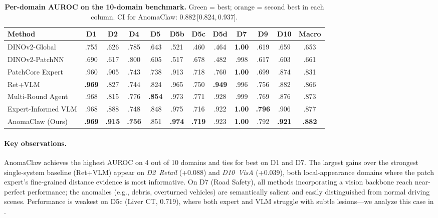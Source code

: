 \begin{table}[t]
\centering
\caption{%
    \textbf{Per-domain AUROC on the 10-domain benchmark.}
    \colorbox{bestcolor}{Green} = best; \colorbox{secondcolor}{orange} = second best in each column.
    CI for AnomaClaw: 0.882\,[0.824,\,0.937].
}
\label{tab:main_results}
\small
\setlength{\tabcolsep}{3.8pt}
\begin{tabular}{@{}lcccccccccc|c@{}}
\toprule
Method & D1 & D2 & D4 & D5 & D5b & D5c & D5d & D7 & D9 & D10 & Macro \\
\midrule
DINOv2-Global
    & .755 & .626 & .785 & .643 & .521 & .460 & .464
    & \cellcolor{bestcolor}\textbf{1.00} & .619 & .659 & .653 \\
DINOv2-PatchNN
    & .690 & .617 & \cellcolor{secondcolor}.800 & .605 & .517 & .678 & .482
    & \cellcolor{secondcolor}.998 & .617 & .603 & .661 \\
PatchCore Expert
    & .960 & .905 & .743 & .738 & .913 & \cellcolor{secondcolor}.718 & .760
    & \cellcolor{bestcolor}\textbf{1.00} & .699 & .874 & .831 \\
Ret+VLM
    & \cellcolor{bestcolor}\textbf{.969} & .827 & .744 & .824 & .965 & .750 & \cellcolor{bestcolor}\textbf{.949}
    & .996 & .756 & .882 & .866 \\
Multi-Round Agent
    & .968 & .815 & \cellcolor{secondcolor}.776 & \cellcolor{bestcolor}\textbf{.854} & .973 & .771 & .928
    & .999 & .769 & .876 & .873 \\
Expert-Informed VLM
    & .968 & \cellcolor{secondcolor}.888 & .748 & .848 & \cellcolor{secondcolor}.975 & .716 & .922
    & \cellcolor{bestcolor}\textbf{1.00} & \cellcolor{bestcolor}\textbf{.796} & .906 & .877 \\
\rowcolor{gray!10}
AnomaClaw (Ours)
    & \cellcolor{bestcolor}\textbf{.969} & \cellcolor{bestcolor}\textbf{.915} & \cellcolor{bestcolor}\textbf{.756} & \cellcolor{secondcolor}.851 & \cellcolor{bestcolor}\textbf{.974} & \cellcolor{bestcolor}\textbf{.719} & \cellcolor{secondcolor}.923
    & \cellcolor{bestcolor}\textbf{1.00} & \cellcolor{secondcolor}.792 & \cellcolor{bestcolor}\textbf{.921} & \cellcolor{bestcolor}\textbf{.882} \\
\bottomrule
\end{tabular}
\end{table}

\paragraph{Key observations.}
AnomaClaw achieves the highest AUROC on 4 out of 10 domains and ties for best on D1 and D7.
The largest gains over the strongest single-system baseline (Ret+VLM) appear on \emph{D2~Retail} (+0.088) and \emph{D10~VisA} (+0.039), both local-appearance domains where the patch expert's fine-grained distance evidence is most informative.
On D7 (Road Safety), all methods incorporating a vision backbone reach near-perfect performance; the anomalies (e.g., debris, overturned vehicles) are semantically salient and easily distinguished from normal driving scenes.
Performance is weakest on D5c (Liver CT, 0.719), where both expert and VLM struggle with subtle lesions---we analyze this case in .

